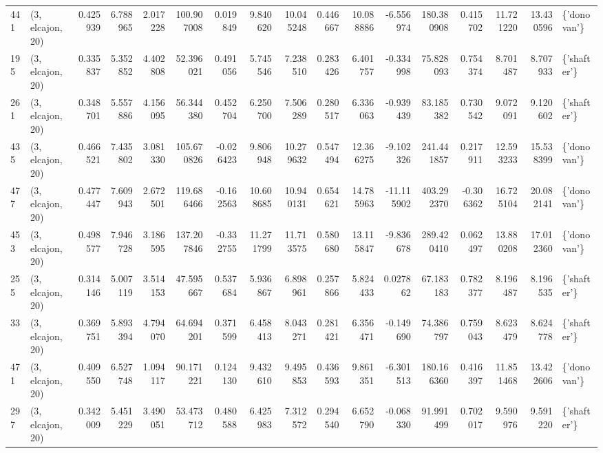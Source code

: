 \begin{tabular}{llrrrrrrrrrrrrrrl}
441 &  (3, elcajon, 20) &   0.425939 &   6.788965 &   2.017228 &   100.907008 &   0.019849 &   9.840620 &  10.045248 &  0.446667 &  10.088886 &  -6.556974 &   180.380908 &   0.415702 &  11.721220 &  13.430596 &  \{'donovan'\} \\
195 &  (3, elcajon, 20) &   0.335837 &   5.352852 &   4.402808 &    52.396021 &   0.491056 &   5.745546 &   7.238510 &  0.283426 &   6.401757 &  -0.334998 &    75.828093 &   0.754374 &   8.701487 &   8.707933 &  \{'shafter'\} \\
261 &  (3, elcajon, 20) &   0.348701 &   5.557886 &   4.156095 &    56.344380 &   0.452704 &   6.250700 &   7.506289 &  0.280517 &   6.336063 &  -0.939439 &    83.185382 &   0.730542 &   9.072091 &   9.120602 &  \{'shafter'\} \\
435 &  (3, elcajon, 20) &   0.466521 &   7.435802 &   3.081330 &   105.670826 &  -0.026423 &   9.806948 &  10.279632 &  0.547494 &  12.366275 &  -9.102326 &   241.441857 &   0.217911 &  12.593233 &  15.538399 &  \{'donovan'\} \\
477 &  (3, elcajon, 20) &   0.477447 &   7.609943 &   2.672501 &   119.686466 &  -0.162563 &  10.608685 &  10.940131 &  0.654621 &  14.785963 & -11.115902 &   403.292370 &  -0.306362 &  16.725104 &  20.082141 &  \{'donovan'\} \\
453 &  (3, elcajon, 20) &   0.498577 &   7.946728 &   3.186595 &   137.207846 &  -0.332755 &  11.271799 &  11.713575 &  0.580680 &  13.115847 &  -9.836678 &   289.420410 &   0.062497 &  13.880208 &  17.012360 &  \{'donovan'\} \\
255 &  (3, elcajon, 20) &   0.314146 &   5.007119 &   3.514153 &    47.595667 &   0.537684 &   5.936867 &   6.898961 &  0.257866 &   5.824433 &   0.027862 &    67.183183 &   0.782377 &   8.196487 &   8.196535 &  \{'shafter'\} \\
33  &  (3, elcajon, 20) &   0.369751 &   5.893394 &   4.794070 &    64.694201 &   0.371599 &   6.458413 &   8.043271 &  0.281421 &   6.356471 &  -0.149690 &    74.386797 &   0.759043 &   8.623479 &   8.624778 &  \{'shafter'\} \\
471 &  (3, elcajon, 20) &   0.409550 &   6.527748 &   1.094117 &    90.171221 &   0.124130 &   9.432610 &   9.495853 &  0.436593 &   9.861351 &  -6.301513 &   180.166360 &   0.416397 &  11.851468 &  13.422606 &  \{'donovan'\} \\
297 &  (3, elcajon, 20) &   0.342009 &   5.451229 &   3.490051 &    53.473712 &   0.480588 &   6.425983 &   7.312572 &  0.294540 &   6.652790 &  -0.068330 &    91.991499 &   0.702017 &   9.590976 &   9.591220 &  \{'shafter'\} \\

\end{tabular}
